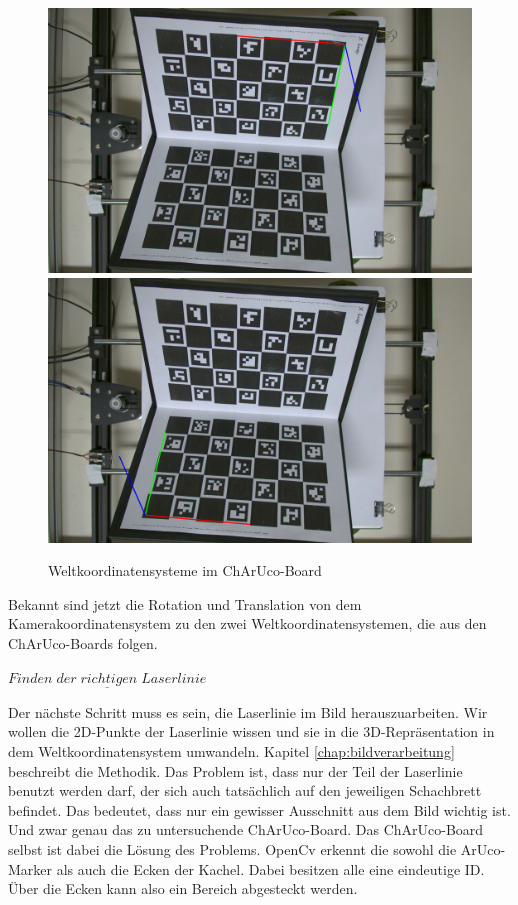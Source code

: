 		\begin{figure}[h]
			\centering
			\includegraphics[width=0.49\linewidth]{img/hauptteil/ext-calib/charuco_primary.png}
			\includegraphics[width=0.49\linewidth]{img/hauptteil/ext-calib/charuco_secondary.png}
			\caption{Weltkoordinatensysteme im ChArUco-Board}
			\label{fig:ext-calib-poses}
		\end{figure}
	
		Bekannt sind jetzt die Rotation und Translation von dem Kamerakoordinatensystem zu den zwei Weltkoordinatensystemen, die aus den ChArUco-Boards folgen.
		
		$\underline{Finden \; der \; richtigen \; Laserlinie}$
		
		Der nächste Schritt muss es sein, die Laserlinie im Bild herauszuarbeiten. Wir wollen die 2D-Punkte der Laserlinie wissen und sie in die 3D-Repräsentation in dem Weltkoordinatensystem umwandeln. Kapitel \ref{chap:bildverarbeitung} beschreibt die Methodik. Das Problem ist, dass nur der Teil der Laserlinie benutzt werden darf, der sich auch tatsächlich auf den jeweiligen Schachbrett befindet. Das bedeutet, dass nur ein gewisser Ausschnitt aus dem Bild wichtig ist. Und zwar genau das zu untersuchende ChArUco-Board. \newline
		Das ChArUco-Board selbst ist dabei die Lösung des Problems. OpenCv erkennt die sowohl die ArUco-Marker als auch die Ecken der Kachel. Dabei besitzen alle eine eindeutige ID. Über die Ecken kann also ein Bereich abgesteckt werden.
		
